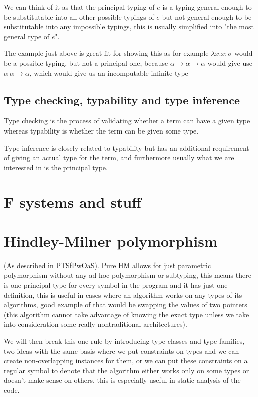 We can think of it as that the principal typing of $e$ is a typing general enough to be substitutable into all other possible typings of $e$
but not general enough to be substitutable into any impossible typings, this is usually simplified into "the most general type of $e$". %

The example just above %
is great fit for showing this as for example $\lambda x . x : \sigma$ would be a possible typing, but not a principal one, because
$\alpha \rightarrow \alpha \rightarrow \alpha$ would give use $\alpha ~ \alpha \rightarrow \alpha$, which would give us an incomputable
infinite type %

\subsection{Type checking, typability and type inference}

Type checking is the process of validating whether a term can have a given type
whereas typability is whether the term can be given some type.

Type inference is closely related to typability but has an additional requirement of giving an actual type for the term, and furthermore
usually what we are interested in is the principal type.

\section{F systems and stuff} %

\section{Hindley-Milner polymorphism}

(As described in PTSfPwOaS).
Pure HM allows for just parametric polymorphism without any ad-hoc polymorphism
or subtyping, this means there is one principal type for every symbol in the program and it has just one definition, this is useful in cases
where an algorithm works on any types of its algorithms, good example of that would be swapping the values of two pointers (this algorithm cannot
take advantage of knowing the exact type unless we take into consideration some really nontraditional architectures).

We will then break this one
rule by introducing type classes and type families, two ideas with the same basis where we put constraints on types and we can
create non-overlapping instances for them, or we can put these constraints on a regular symbol to denote that the algorithm either works only on
some types or doesn't make sense on others, this is especially useful in static analysis of the code.

